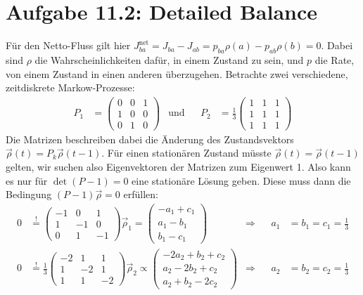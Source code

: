 \documentclass[a4paper,12pt]{article}
\newcommand{\tecxt}{}
\begin{document}
\section*{Aufgabe 11.2: Detailed Balance}
Für den Netto-Fluss gilt hier $J_{ba}^\tecxt\text{net}=J_{ba}-J_{ab}=p_{ba}\rho(a)-p_{ab}\rho(b)=0$. Dabei sind $\rho$ die Wahrscheinlichkeiten dafür, in einem Zustand zu sein, und $p$ die Rate, von einem Zustand in einen anderen überzugehen. Betrachte zwei verschiedene, zeitdiskrete Markow-Prozesse:
\begin{align*}
P_1&=\begin{pmatrix}
0&0&1 \\ 1&0&0 \\ 0&1&0
\end{pmatrix}&\tecxt\text{und}&&P_2&=\frac{1}{3}\begin{pmatrix}
1&1&1 \\ 1&1&1 \\1&1&1
\end{pmatrix}
\end{align*}
Die Matrizen beschreiben dabei die Änderung des Zustandsvektors $\vec{\rho}(t)=P_k\vec{\rho}(t-1)$. Für einen stationären Zustand müsste $\vec{\rho}(t)=\vec{\rho}(t-1)$ gelten, wir suchen also Eigenvektoren der Matrizen zum Eigenwert 1. Also kann es nur für $\det (P-1)=0$ eine stationäre Lösung geben. Diese muss dann die Bedingung $(P-1)\vec{\rho}=0$ erfüllen:
\begin{align*}
0&\overset{!}{=}\begin{pmatrix}
-1&0&1 \\ 1&-1&0 \\ 0&1&-1
\end{pmatrix}\vec{\rho}_1=\begin{pmatrix}
-a_1+c_1 \\ a_1-b_1 \\ b_1-c_1
\end{pmatrix}&\Rightarrow &&a_1&=b_1=c_1=\frac{1}{3} \\
0&\overset{!}{=}\frac{1}{3}\begin{pmatrix}
-2&1&1 \\ 1&-2&1 \\1&1&-2
\end{pmatrix}\vec{\rho}_2\propto\begin{pmatrix}
-2a_2+b_2+c_2 \\ a_2-2b_2+c_2 \\ a_2+b_2-2c_2
\end{pmatrix}&\Rightarrow &&a_2&=b_2=c_2=\frac{1}{3}
\end{align*}
\end{document}
